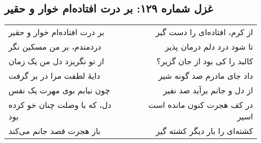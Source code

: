 \begin{center}
\section*{غزل شماره ۱۲۹: بر درت افتاده‌ام خوار و حقیر}
\label{sec:129}
\begin{longtable}{l p{0.5cm} r}
بر درت افتاده‌ام خوار و حقیر
&&
از کرم، افتاده‌ای را دست گیر
\\
دردمندم، بر من مسکین نگر
&&
تا شود درد دلم درمان پذیر
\\
از تو نگریزد دل من یک زمان
&&
کالبد را کی بود از جان گزیر؟
\\
دایهٔ لطفت مرا در بر گرفت
&&
داد جای مادرم صد گونه شیر
\\
چون نیابم بوی مهرت یک نفس
&&
از دل و جانم برآید صد نفیر
\\
دل، که با وصلت چنان خو کرده بود
&&
در کف هجرت کنون مانده است اسیر
\\
باز هجرت قصد جانم می‌کند
&&
کشته‌ای را بار دیگر کشته گیر
\\
\end{longtable}
\end{center}
